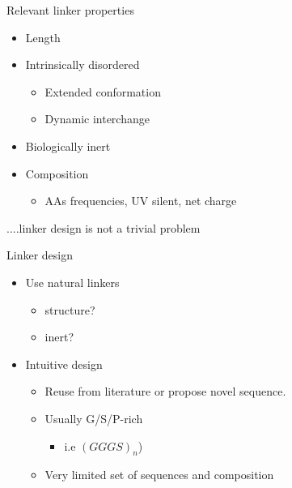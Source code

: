 \documentclass{beamer}
\begin{document}
\begin{frame}{Relevant linker properties}
\begin{itemize}
  \item Length
  \item Intrinsically disordered
    \begin{itemize}
    \item Extended conformation
    \item Dynamic interchange
    \end{itemize}
  \item Biologically inert
  \item Composition
    \begin{itemize}
     \item AAs frequencies, UV silent, net charge
    \end{itemize}
\end{itemize}
\pause
\vspace{15px}
\Large{....linker design is not a trivial problem}
\end{frame}



\begin{frame}{Linker design}
\begin{itemize}
 \item Use natural linkers
 \pause
 \begin{itemize}
  \item structure?
  \item inert?

 \pause 
 \end{itemize}
 \item Intuitive design
 \pause
 \begin{itemize}
  \item Reuse from literature or propose novel sequence. 
  \item Usually G/S/P-rich 
  \begin{itemize}
   \item  i.e $(GGGS)_n$) 
  \end{itemize}
  \item Very limited set of sequences and composition
  \end{itemize}

\end{itemize}
\end{frame}
\end{document}
